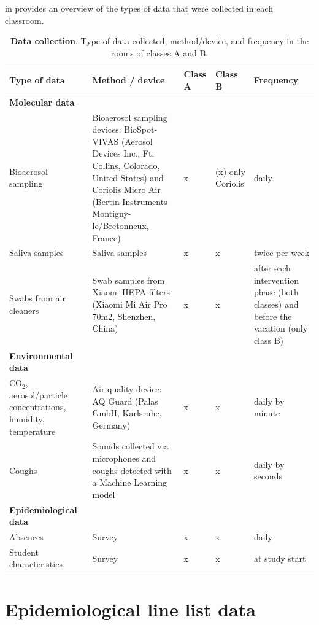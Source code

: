 \documentclass[fleqn,11pt]{wlscirep_supp}
\begin{document}
 in \supp provides an overview of the types of data that were collected in each classroom.

\begin{table}[!htpb]
    \footnotesize
    \centering
    \caption{\textbf{Data collection}. Type of data collected, method/device, and frequency in the rooms of classes A and B.}
    \begin{tabular}{p{3.5cm}p{6cm} p{1cm} p{1cm} p{3cm}}
    \midrule
    Type of data & Method / device & Class A & Class B & Frequency \\
    \midrule
    \textbf{Molecular data} \\
    \midrule
    Bioaerosol sampling & Bioaerosol sampling devices: BioSpot-VIVAS (Aerosol Devices Inc., Ft. Collins, Colorado, United States) and Coriolis Micro Air (Bertin Instruments Montigny-le/Bretonneux, France) & x & (x) \newline only Coriolis & daily \\
    Saliva samples & Saliva samples & x & x & twice per week \\
    Swabs from air cleaners & Swab samples from Xiaomi HEPA filters (Xiaomi Mi Air Pro 70m2, Shenzhen, China) & x & x & after each intervention phase (both classes) and before the vacation (only class B) \\ 
    \midrule
    \textbf{Environmental data} \\
    \midrule
    CO$_2$, aerosol/particle concentrations, humidity, temperature & Air quality device: AQ Guard (Palas GmbH, Karlsruhe, Germany) & x & x & daily by minute \\
    Coughs & Sounds collected via microphones and coughs detected with a Machine Learning model \cite{Bertschinger2023CBMS} & x & x & daily by seconds \\
    \midrule
    \textbf{Epidemiological data} \\
    \midrule
    Absences & Survey & x & x & daily \\
    Student characteristics & Survey & x & x & at study start \\
    \bottomrule
    \end{tabular}
    \label{tab:data}
\end{table}

\clearpage

\section{Epidemiological line list data}\label{sec:case-data}
\end{document}
